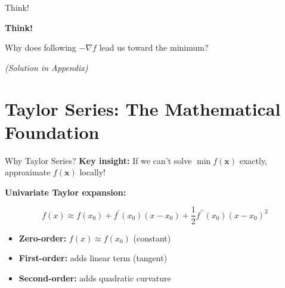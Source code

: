\documentclass[aspectratio=169,11pt]{beamer}
\newcommand{\grad}{\nabla}
\newcommand{\vx}{\bm{x}}
\begin{document}
\begin{frame}{Think!}
\begin{center}
\Large \textbf{Think!}
\end{center}

Why does following $-\grad f$ lead us toward the minimum?

\pause
\vspace{1cm}
\textit{(Solution in Appendix)}
\end{frame}

\section{Taylor Series: The Mathematical Foundation}

\begin{frame}{Why Taylor Series?}
\textbf{Key insight:} If we can't solve $\min f(\vx)$ exactly, approximate $f(\vx)$ locally!

\pause
\textbf{Univariate Taylor expansion:}
\begin{center}
\Large
\[f(x) \approx f(x_0) + f^{\prime}(x_0)(x-x_0) + \frac{1}{2}f^{\prime\prime}(x_0)(x-x_0)^2\]
\end{center}

\pause
\begin{itemize}
\item \textbf{Zero-order:} $f(x) \approx f(x_0)$ (constant)
\item \textbf{First-order:} adds linear term (tangent)
\item \textbf{Second-order:} adds quadratic curvature
\end{itemize}
\end{frame}
\end{document}
